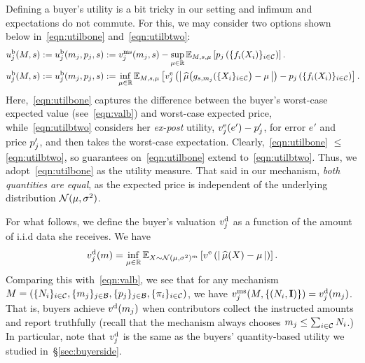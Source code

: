 Defining a buyer's utility is a bit tricky in our setting and infimum and expectations do not commute.
For this, we may consider two options shown below in~\eqref{eqn:utilbone} and~\eqref{eqn:utilbtwo}:
\begin{align}
\hspace{-0.07in}
    &\utilbj(M, \strat) \defeq
        \utilbj(\mmj, \pricej, \strat) \defeq
        \valmechj(\mmj, \strat) - \sup_{\mu\in\RR} \EE_{M, \strat, \mu}\left[ 
       \pricej\left( \{ \subfunci(\initdatai)\}_{i\in\contributors}\right)
       \right]. 
    \hspace{-0.03in}
    \label{eqn:utilbone} \\
    &\utilbj(M, \strat) \defeq
        \utilbj(\mmj, \pricej, \strat) \defeq
        \inf_{\mu\in\RR} \EE_{M, \strat, \mu}\left[ \valfuncj\left( 
       \left|\,\muhat\big(\genstratmj( \{\initdatai\}_{i\in\contributors} \big) - \mu\,\right| \right)
       - \pricej\left( \{ \subfunci(\initdatai)\}_{i\in\contributors}\right)
       \right].
    \hspace{-0.03in}
    \label{eqn:utilbtwo}
\end{align}
Here,~\eqref{eqn:utilbone} captures the difference between the buyer's worst-case expected value (see~\eqref{eqn:valb}) and worst-case expected price, while~\eqref{eqn:utilbtwo} considers her \emph{ex-post} utility, $v^{\rm e}_{j}(e') - p_j'$, for error $e'$ and price $p_j'$, and then takes the worst-case expectation.  
Clearly,~\eqref{eqn:utilbone} $\leq$ \eqref{eqn:utilbtwo}, so guarantees on~\eqref{eqn:utilbone} extend to~\eqref{eqn:utilbtwo}. Thus, we adopt~\eqref{eqn:utilbone} as the utility measure.  
That said in our mechanism, \emph{both quantities are equal}, as the expected price is independent of the underlying distribution $\mathcal{N}(\mu, \sigma^2)$.  

For what follows, we define the buyer's valuation $v^{\rm d}_{j}$ as a function of the amount of i.i.d data she receives. We have
\begin{align}
    \label{eqn:valdataj}
    v^{\rm d}_{j}(m) = \inf_{\mu\in\mathbb{R}} \mathbb{E}_{X\sim\mathcal{N}(\mu,\sigma^2)^m}\left[
        v^{\rm e}\left(\left|\,\widehat{\mu}(X) - \mu\,\right|\right)
    \right].
\end{align}
Comparing this with~\eqref{eqn:valb}, we see that for any mechanism 
$M = \left(\{N_i\}_{i\in\mathcal{C}}, \{m_j\}_{j \in \mathcal{B}}, \{p_j\}_{j \in \mathcal{B}}, \{\pi_i\}_{i \in \mathcal{C}}\right)
$, we have
$v^{\rm ms}_{j}(M, \{(N_i, {\rm \bf I})\}) = v^{\rm d}_{j}(m_j)$.
That is, buyers achieve $v^{\rm d}(m_j)$ when contributors collect the instructed amounts and report truthfully (recall that the mechanism always chooses $m_j\leq \sum_{i\in\mathcal{C}} N_i$.)
In particular, note that $v^{\rm d}_{j}$ is the same as the buyers' quantity-based utility we studied in~\S\ref{sec:buyerside}.

